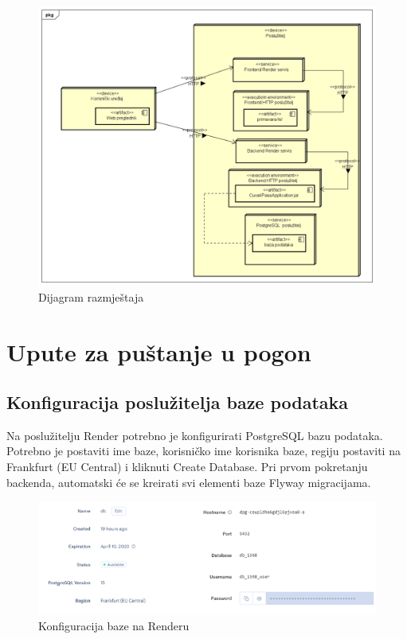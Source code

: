 			 \begin{figure}[H]
			 	\centering
			 	\includegraphics[width=15cm]{slike/Dijagram razmjestaja}
			 	\caption{Dijagram razmještaja}
			 	\label{fig:Activity-Diagram}
			 \end{figure}
			
			\eject 
		
		\section{Upute za puštanje u pogon}
			
			\subsection{Konfiguracija poslužitelja baze podataka}
			
			Na poslužitelju Render potrebno je konfigurirati PostgreSQL bazu podataka. Potrebno je postaviti ime baze, korisničko ime korisnika baze, regiju postaviti na Frankfurt (EU Central) i kliknuti Create Database. Pri prvom pokretanju backenda, automatski će se kreirati svi elementi baze Flyway migracijama.
			
			\begin{figure}[H]
				\centering
				\includegraphics[width=12cm]{slike/konfiguracijaBazeNaRenderu}
				\caption{Konfiguracija baze na Renderu}
				\label{fig:Baza-Render}
			\end{figure}
			
